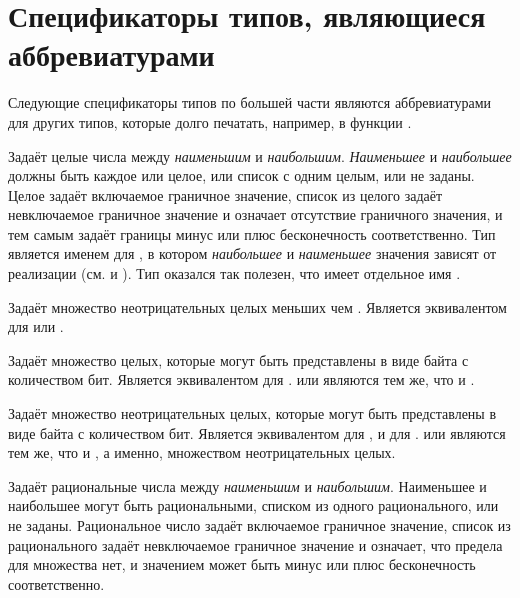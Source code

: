 \section{Спецификаторы типов, являющиеся аббревиатурами}

Следующие спецификаторы типов по большей части являются аббревиатурами для других
типов, которые долго печатать, например, в функции .
\begin{flushdesc}

\item[\cd{(integer \emph{наименьшее} \emph{наибольшее})}]
Задаёт целые числа между \emph{наименьшим} и
\emph{наибольшим}. \emph{Наименьшее} и \emph{наибольшее} должны быть
каждое или целое, или список с одним целым, или не заданы.
Целое задаёт включаемое граничное значение, список из целого задаёт невключаемое
граничное значение и \cdf{*} означает отсутствие граничного значения, и тем самым
задаёт границы минус или плюс бесконечность соответственно.
Тип  является именем для , в котором \emph{наибольшее} и \emph{наименьшее}
значения зависят от реализации (см.  и
).
Тип  оказался так полезен, что имеет отдельное имя .

\item[\cd{(mod \emph{n})}]
Задаёт множество неотрицательных целых меньших чем . Является эквивалентом
для  или .

\item[\cd{(signed-byte \emph{s})}]
Задаёт множество целых, которые могут быть представлены в виде байта с 
количеством бит. Является эквивалентом для .
 или  являются тем же, что и .

\item[\cd{(unsigned-byte \emph{s})}]
Задаёт множество неотрицательных целых, которые могут быть представлены в виде байта с 
количеством бит. Является эквивалентом для , и для .
 или  являются тем же, что и
, а именно, множеством неотрицательных целых.

\item[\cd{(rational \emph{наименьшее} \emph{наибольшее})}]
Задаёт рациональные числа между \emph{наименьшим} и
\emph{наибольшим}. Наименьшее и наибольшее могут быть рациональными, списком
из одного рационального, или не заданы.
Рациональное число задаёт включаемое граничное значение, список из
рационального задаёт невключаемое граничное значение и \cdf{*} означает, что
предела для множества нет, и значением может быть минус или плюс бесконечность соответственно.


\end{flushdesc}
